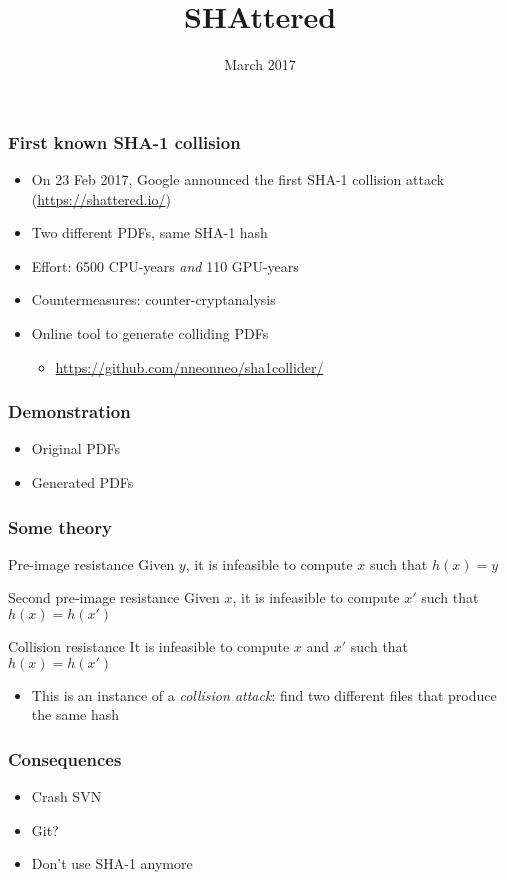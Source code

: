 \documentclass{beamer}
\title{SHAttered}
\date{March 2017}
\begin{document}
\begin{frame}
 \frametitle{First known SHA-1 collision}
 \begin{itemize}
  \item On 23 Feb 2017, Google announced the first SHA-1 collision
        attack (\url{https://shattered.io/}) \pause
  \item Two different PDFs, same SHA-1 hash \pause
  \item Effort: 6500 CPU-years \emph{and} 110 GPU-years \pause
  \item Countermeasures: counter-cryptanalysis \pause
  \item Online tool to generate colliding PDFs \pause
  \begin{itemize}
   \item \url{https://github.com/nneonneo/sha1collider/}
  \end{itemize}
 \end{itemize}
\end{frame}

\begin{frame}
 \frametitle{Demonstration}
 \begin{itemize}
  \item Original PDFs
  \item Generated PDFs
 \end{itemize}
\end{frame}

\begin{frame}
 \frametitle{Some theory}
 \begin{block}{Pre-image resistance}
  Given $y$, it is infeasible to compute $x$ such that $h(x) = y$
 \end{block} \pause
 \begin{block}{Second pre-image resistance}
  Given $x$, it is infeasible to compute $x'$ such that $h(x) = h(x')$
 \end{block} \pause
 \begin{block}{Collision resistance}
  It is infeasible to compute $x$ and $x'$ such that $h(x) = h(x')$
 \end{block} \pause
 \begin{itemize}
  \item This is an instance of a \emph{collision attack}: find two
        different files that produce the same hash
 \end{itemize}
\end{frame}

\begin{frame}
 \frametitle{Consequences}
 \begin{itemize}
  \item Crash SVN \pause
  \item Git? \pause
  \item Don't use SHA-1 anymore
 \end{itemize}
\end{frame}
\end{document}
